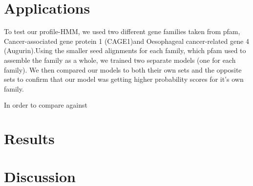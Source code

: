 \documentclass{article}
\begin{document}
\section{Applications}
To test our profile-HMM, we used two different gene families taken from pfam, Cancer-associated gene protein 1 (CAGE1)\footnotemark[3] and Oesophageal cancer-related gene 4 (Augurin).\footnotemark[4] Using the smaller seed alignments for each family, which pfam used to assemble the family as a whole, we trained two separate models (one for each family). We then compared our models to both their own sets and the opposite sets to confirm that our model was getting higher probability scores for it's own family.

In order to compare against 


\section{Results}


\section{Discussion}


% 
% 
% 



% 
\end{document}
